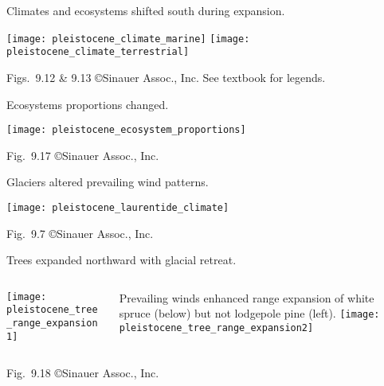 \documentclass[t]{beamer}
\begin{document}
%

\begin{frame}[t]{Climates and ecosystems shifted south during expansion.}
	\vspace{-\baselineskip}
	\begin{center}
		\texttt{[image: pleistocene\_climate\_marine]}\hspace*{1cm}
		\texttt{[image: pleistocene\_climate\_terrestrial]}
	\end{center}
	
	\vfilll
	
	\tiny \hfill Figs.~9.12 \& 9.13 \copyright Sinauer Assoc., Inc. See textbook for legends.
\end{frame}
%
\begin{frame}{Ecosystems proportions changed.}
	
	{\centering
		\texttt{[image: pleistocene\_ecosystem\_proportions]}\par
	}

	\vfilll
	
	\hfill \tiny Fig.~9.17 \copyright Sinauer Assoc., Inc.
\end{frame}
%
\begin{frame}{Glaciers altered prevailing wind patterns.}

	{\centering
		\texttt{[image: pleistocene\_laurentide\_climate]}\par
	}

	\vfilll

	\hfill \tiny Fig.~9.7 \copyright Sinauer Assoc., Inc.
\end{frame}
%
\begin{frame}{Trees expanded northward with glacial retreat.}
	\begin{columns}[T]
		\begin{column}{0.3\textwidth}
			\texttt{[image: pleistocene\_tree\_range\_expansion1]}
		\end{column}
		\begin{column}{0.65\textwidth}
			Prevailing winds enhanced range expansion of white spruce (below) but not lodgepole pine (left).\vspace*{0.6\baselineskip}
			\texttt{[image: pleistocene\_tree\_range\_expansion2]}
		\end{column}
	\end{columns}

	\vfilll

	\hfill \tiny Fig.~9.18 \copyright Sinauer Assoc., Inc.

\end{frame}
\end{document}
